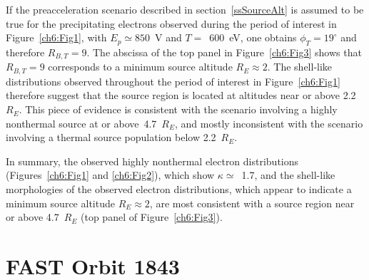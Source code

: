   If the preacceleration scenario described in section~\ref{ssSourceAlt} is
  assumed to be true for the precipitating electrons observed during the period
  of interest in Figure~\ref{ch6:Fig1}, with $E_p \simeq 850$~V and
  $T =$~600~eV, one obtains $\phi_T = 19^\circ$ and therefore $R_{B,T} = 9$. The
  abscissa of the top panel in Figure~\ref{ch6:Fig3} shows that $R_{B,T} = 9$
  corresponds to a minimum source altitude $R_E \approx 2$.
  The shell-like distributions observed throughout the period of interest in
  Figure~\ref{ch6:Fig1} therefore suggest that the source region is located at
  altitudes near or above 2.2~$R_E$.
  This piece of evidence is consistent with the scenario involving a highly
  nonthermal source at or above~4.7~$R_E$,
  and mostly inconsistent with the scenario involving a thermal source
  population below 2.2~$R_E$.

  In summary, the observed highly nonthermal electron distributions
  (Figures~\ref{ch6:Fig1} and \ref{ch6:Fig2}), which show $\kappa
  \simeq$~1.7, and the shell-like morphologies of the observed electron
  distributions, which appear to indicate a minimum source altitude $R_E
  \approx 2$, are most consistent with a source region near or above
  4.7~$R_E$ (top panel of Figure~\ref{ch6:Fig3}).





  
  \section{FAST Orbit 1843}



